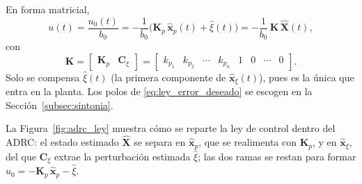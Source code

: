 En forma matricial,
\begin{equation}
u(t) = \frac{u_0(t)}{b_0}
  = -\frac{1}{b_0}\bigl(\mathbf{K}_p\,\hat{\mathbf{x}}_p(t) + \hat{\xi}(t)\bigr)
  = -\frac{1}{b_0}\,\mathbf{K}\,\widehat{\mathbf{X}}(t),
\label{eq:ley_matricial}
\end{equation}
con
\begin{equation}
\mathbf{K} =
\begin{bmatrix} \mathbf{K}_p & \mathbf{C}_{\xi} \end{bmatrix}
=
\begin{bmatrix} k_{p_1} & k_{p_2} & \cdots & k_{p_n} & 1 & 0 & \cdots & 0 \end{bmatrix} .
\end{equation}
Solo se compensa $\hat{\xi}(t)$ (la primera componente de $\hat{\mathbf{x}}_{\xi}(t)$),
pues es la única que entra en la planta. Los polos de \eqref{eq:ley_error_deseado} se escogen en
la Sección~\ref{subsec:sintonia}.

La Figura~\ref{fig:adrc_ley} muestra cómo se reparte la ley de control dentro del
ADRC: el estado estimado $\widehat{\mathbf{X}}$ se separa en $\hat{\mathbf{x}}_p$,
que se realimenta con $\mathbf{K}_p$, y en $\hat{\mathbf{x}}_{\xi}$, del que
$\mathbf{C}_{\xi}$ extrae la perturbación estimada $\hat{\xi}$; las dos ramas se
restan para formar $u_0 = -\mathbf{K}_p\,\hat{\mathbf{x}}_p - \hat{\xi}$.

